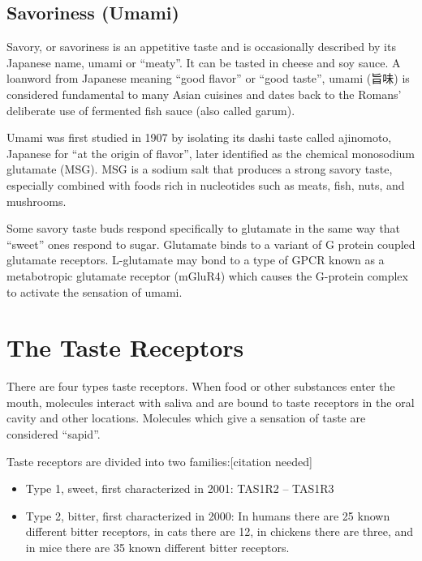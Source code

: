 \hypertarget{savoriness-umami}{%
\subsection{Savoriness (Umami)}\label{savoriness-umami}}

Savory, or savoriness is an appetitive taste and is occasionally described by its Japanese name, umami or ``meaty''. It can be tasted in cheese and soy sauce. A loanword from Japanese meaning ``good flavor'' or ``good taste'', umami (旨味) is considered fundamental to many Asian cuisines and dates back to the Romans' deliberate use of fermented fish sauce (also called garum).

Umami was first studied in 1907 by isolating its dashi taste called ajinomoto, Japanese for ``at the origin of flavor'', later identified as the chemical monosodium glutamate (MSG). MSG is a sodium salt that produces a strong savory taste, especially combined with foods rich in nucleotides such as meats, fish, nuts, and mushrooms.

Some savory taste buds respond specifically to glutamate in the same way that ``sweet'' ones respond to sugar. Glutamate binds to a variant of G protein coupled glutamate receptors. L-glutamate may bond to a type of GPCR known as a metabotropic glutamate receptor (mGluR4) which causes the G-protein complex to activate the sensation of umami.

\hypertarget{the-taste-receptors}{%
\section{The Taste Receptors}\label{the-taste-receptors}}

There are four types taste receptors. When food or other substances enter the mouth, molecules interact with saliva and are bound to taste receptors in the oral cavity and other locations. Molecules which give a sensation of taste are considered ``sapid''.

Taste receptors are divided into two families:{[}citation needed{]}

\begin{itemize}
\tightlist
\item
  Type 1, sweet, first characterized in 2001: TAS1R2 -- TAS1R3
\item
  Type 2, bitter, first characterized in 2000: In humans there are 25 known different bitter receptors, in cats there are 12, in chickens there are three, and in mice there are 35 known different bitter receptors.
\end{itemize}

